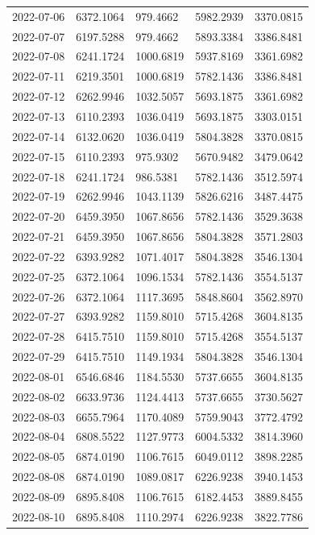 \begin{footnotesize}
\begin{longtable}{lllll}
2022-07-06 & 6372.1064 & 979.4662 & 5982.2939 & 3370.0815 \\
2022-07-07 & 6197.5288 & 979.4662 & 5893.3384 & 3386.8481 \\
2022-07-08 & 6241.1724 & 1000.6819 & 5937.8169 & 3361.6982 \\
2022-07-11 & 6219.3501 & 1000.6819 & 5782.1436 & 3386.8481 \\
2022-07-12 & 6262.9946 & 1032.5057 & 5693.1875 & 3361.6982 \\
2022-07-13 & 6110.2393 & 1036.0419 & 5693.1875 & 3303.0151 \\
2022-07-14 & 6132.0620 & 1036.0419 & 5804.3828 & 3370.0815 \\
2022-07-15 & 6110.2393 & 975.9302 & 5670.9482 & 3479.0642 \\
2022-07-18 & 6241.1724 & 986.5381 & 5782.1436 & 3512.5974 \\
2022-07-19 & 6262.9946 & 1043.1139 & 5826.6216 & 3487.4475 \\
2022-07-20 & 6459.3950 & 1067.8656 & 5782.1436 & 3529.3638 \\
2022-07-21 & 6459.3950 & 1067.8656 & 5804.3828 & 3571.2803 \\
2022-07-22 & 6393.9282 & 1071.4017 & 5804.3828 & 3546.1304 \\
2022-07-25 & 6372.1064 & 1096.1534 & 5782.1436 & 3554.5137 \\
2022-07-26 & 6372.1064 & 1117.3695 & 5848.8604 & 3562.8970 \\
2022-07-27 & 6393.9282 & 1159.8010 & 5715.4268 & 3604.8135 \\
2022-07-28 & 6415.7510 & 1159.8010 & 5715.4268 & 3554.5137 \\
2022-07-29 & 6415.7510 & 1149.1934 & 5804.3828 & 3546.1304 \\
2022-08-01 & 6546.6846 & 1184.5530 & 5737.6655 & 3604.8135 \\
2022-08-02 & 6633.9736 & 1124.4413 & 5737.6655 & 3730.5627 \\
2022-08-03 & 6655.7964 & 1170.4089 & 5759.9043 & 3772.4792 \\
2022-08-04 & 6808.5522 & 1127.9773 & 6004.5332 & 3814.3960 \\
2022-08-05 & 6874.0190 & 1106.7615 & 6049.0112 & 3898.2285 \\
2022-08-08 & 6874.0190 & 1089.0817 & 6226.9238 & 3940.1453 \\
2022-08-09 & 6895.8408 & 1106.7615 & 6182.4453 & 3889.8455 \\
2022-08-10 & 6895.8408 & 1110.2974 & 6226.9238 & 3822.7786 \\

\end{longtable}
\end{footnotesize}
